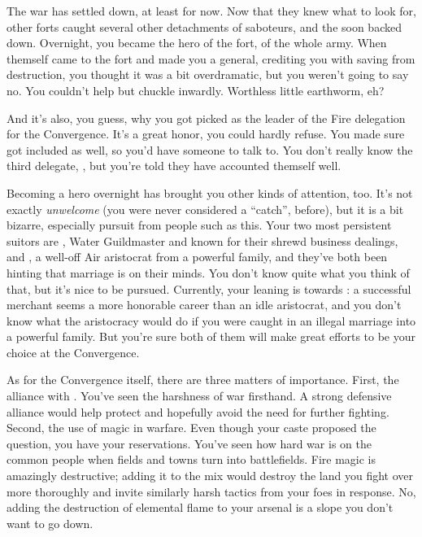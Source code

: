\documentclass[char]{iron}
\begin{document}
The war has settled down, at least for now.  Now that they knew what
to look for, other forts caught several other detachments of
saboteurs, and the \sMulanCountryPeople{} soon backed down.
Overnight, you became the hero of the fort, of the whole army.  When
\cRoyalty{} themself came to the fort and made you a general,
crediting you with saving \sHomeCountry{} from destruction, you
thought it was a bit overdramatic, but you weren't going to say no.
You couldn't help but chuckle inwardly.  Worthless little earthworm,
eh?

And it's also, you guess, why you got picked as the leader of the Fire
delegation for the Convergence.  It's a great honor, you could hardly
refuse.  You made sure \cLieutenant{\first} got included as well, so
you'd have someone to talk to.  You don't really know the third delegate, \cRealPriest{\intro},  but you're told they have accounted themself well.

Becoming a hero overnight has brought you other kinds of attention,
too.  It's not exactly \emph{unwelcome} (you were never considered a
``catch'', before), but it is a bit bizarre, especially pursuit
from people such as this.  Your two most persistent
suitors are \cGuildmaster{\full}, Water Guildmaster and known for
their shrewd business dealings, and \cBastard{\full}, a well-off Air
aristocrat from a powerful family, and they've both been hinting that
marriage is on their minds.  You don't know quite what you think
of that, but it's nice to be pursued.  Currently, your leaning is towards
\cGuildmaster{}: a successful merchant seems a more honorable career
than an idle aristocrat, and you don't know what the aristocracy would
do if you were caught in an illegal marriage into a powerful family.  But
you're sure both of them will make great efforts to be your choice
at the Convergence.

As for the Convergence itself, there are three matters of importance.
First, the alliance with \sTreatyCountry{}.  You've seen the harshness
of war firsthand.  A strong defensive alliance would help protect
\sHomeCountry{} and hopefully avoid the need for further fighting.
Second, the use of magic in warfare.  Even though your caste proposed
the question, you have your reservations.  You've seen how hard war is
on the common people when fields and towns turn into battlefields.  Fire
magic is amazingly destructive; adding it to the mix would destroy the
land you fight over more thoroughly and invite similarly harsh tactics
from your foes in response.  No, adding the destruction of elemental flame
to your arsenal is a slope you don't want to go down.
\end{document}
